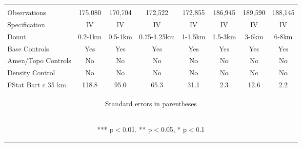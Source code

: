 \begin{tabular}{lccccccc}
\vspace{4pt} & \begin{footnotesize}\end{footnotesize} & \begin{footnotesize}\end{footnotesize} & \begin{footnotesize}\end{footnotesize} & \begin{footnotesize}\end{footnotesize} & \begin{footnotesize}\end{footnotesize} & \begin{footnotesize}\end{footnotesize} & \begin{footnotesize}\end{footnotesize} \\
Observations & 175,080 & 170,704 & 172,522 & 172,855 & 186,945 & 189,590 & 188,145 \\
Specification & IV & IV & IV & IV & IV & IV & IV \\
Donut & 0.2-1km & 0.5-1km & 0.75-1.25km & 1-1.5km & 1.5-3km & 3-6km & 6-8km \\
Base Controls & Yes & Yes & Yes & Yes & Yes & Yes & Yes \\
Amen/Topo Controls & No & No & No & No & No & No & No \\
Density Control & No & No & No & No & No & No & No \\
 FStat Bart c 35 km & 118.8 & 95.0 & 65.3 & 31.1 & 2.3 & 12.6 & 2.2 \\ \hline
\multicolumn{8}{c}{\begin{footnotesize} Standard errors in parentheses\end{footnotesize}} \\
\multicolumn{8}{c}{\begin{footnotesize} *** p$<$0.01, ** p$<$0.05, * p$<$0.1\end{footnotesize}} \\
\end{tabular}


